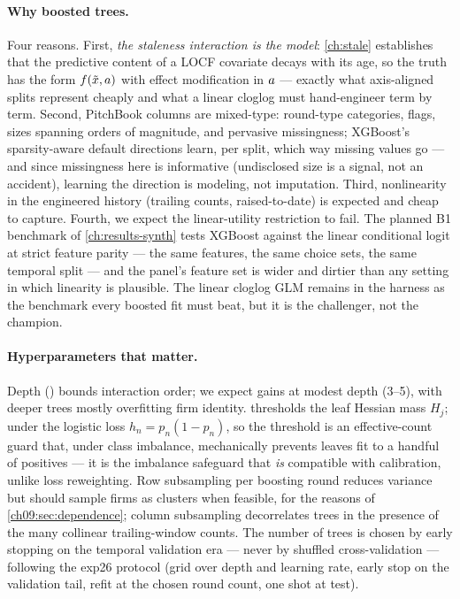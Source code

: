 \paragraph{Why boosted trees.} Four reasons. First, \emph{the staleness
interaction is the model}: \cref{ch:stale} establishes that the
predictive content of a LOCF covariate decays with its age, so the
truth has the form $f(\tilde{x}, a)$ with effect modification
in $a$ --- exactly what axis-aligned splits represent cheaply
and what a linear cloglog must hand-engineer term by term. Second,
PitchBook columns are mixed-type: round-type categories, flags, sizes
spanning orders of magnitude, and pervasive missingness; XGBoost's
sparsity-aware default directions \citep{chenguestrin2016} learn, per
split, which way missing values go --- and since missingness here is
informative (undisclosed size is a signal, not an accident), learning
the direction is modeling, not imputation. Third, nonlinearity in the
engineered history (trailing counts, raised-to-date) is expected and
cheap to capture. Fourth, we expect the linear-utility restriction to
fail. The planned B1 benchmark of \cref{ch:results-synth} tests XGBoost
against the linear conditional logit at strict feature parity --- the
same features, the same choice sets, the same temporal split --- and
the panel's feature set is wider and dirtier than any setting in which
linearity is plausible. The linear cloglog GLM remains in the harness
as the benchmark every boosted fit must beat, but it is the challenger,
not the champion.

\paragraph{Hyperparameters that matter.} Depth ()
bounds interaction order; we expect gains at modest depth (3--5), with
deeper trees mostly overfitting firm identity.
 thresholds the leaf Hessian mass $H_j$; under
the logistic loss $h_n = p_n(1-p_n)$, so the threshold is an
effective-count guard that, under class imbalance, mechanically prevents
leaves fit to a handful of positives --- it is the imbalance safeguard
that \emph{is} compatible with calibration, unlike loss reweighting.
Row subsampling per boosting round reduces variance but should sample
firms as clusters when feasible, for the reasons of
\cref{ch09:sec:dependence}; column subsampling decorrelates trees in the
presence of the many collinear trailing-window counts. The number of
trees is chosen by early stopping on the temporal validation era ---
never by shuffled cross-validation --- following the exp26 protocol
(grid over depth and learning rate, early stop on the validation tail,
refit at the chosen round count, one shot at test).

